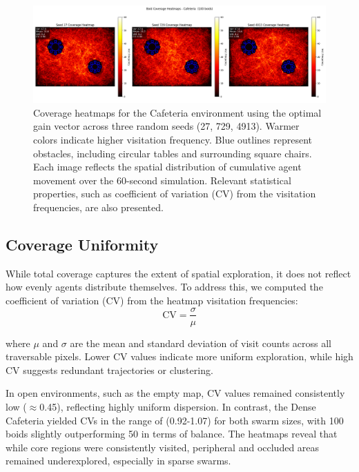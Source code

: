 \documentclass[12pt]{article}
\begin{document}
\begin{figure}[h!]
\centering
\includegraphics[width=\linewidth]{heatmaps/cafeteria_100.png}
\caption{Coverage heatmaps for the Cafeteria environment using the optimal gain vector across three random seeds (27, 729, 4913). Warmer colors indicate higher visitation frequency. Blue outlines represent obstacles, including circular tables and surrounding square chairs. Each image reflects the spatial distribution of cumulative agent movement over the 60-second simulation. Relevant statistical properties, such as coefficient of variation (CV) from the visitation frequencies, are also presented.}
\label{fig:caf_heatmap}
\end{figure}

\subsection{Coverage Uniformity}

While total coverage captures the extent of spatial exploration, it does not reflect how evenly agents distribute themselves. To address this, we computed the coefficient of variation (CV) from the heatmap visitation frequencies:
\begin{equation}\text{CV} = \frac{\sigma}{\mu}\end{equation}

where \(\mu\) and \(\sigma\) are the mean and standard deviation of visit counts across all traversable pixels. Lower CV values indicate more uniform exploration, while high CV suggests redundant trajectories or clustering. 

In open environments, such as the empty map, CV values remained consistently low (\(\approx\)0.45), reflecting highly uniform dispersion. In contrast, the Dense Cafeteria yielded CVs in the range of (0.92-1.07) for both swarm sizes, with 100 boids slightly outperforming 50 in terms of balance. The heatmaps reveal that while core regions were consistently visited, peripheral and occluded areas remained underexplored, especially in sparse swarms.
\end{document}

